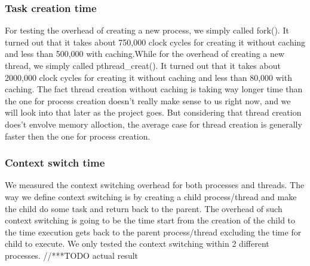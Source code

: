 \subsubsection{Task creation time}
For testing the overhead of creating a new process, we simply called fork(). It turned out that it takes about 750,000 clock cycles for creating it without caching and less than 500,000 with caching.While for the overhead of creating a new thread, we simply called pthread\_creat(). It turned out that it takes about 2000,000 clock cycles for creating it without caching and less than 80,000 with caching.
The fact thread creation without caching is taking way longer time than the one for process creation doesn't really make sense to us right now, and we will look into that later as the project goes. But considering that thread creation does't envolve memory alloction, the average case for thread creation is generally faster then the one for process creation.


\subsubsection{Context switch time}
We measured the context switching overhead for both processes and threads. The way we define context switching is by creating a child process/thread and make the child do some task and return back to the parent. The overhead of such context switching is going to be the time start from the creation of the child to the time execution gets back to the parent process/thread excluding the time for child to execute. We only tested the context switching within 2 different processes.
//***TODO actual result



